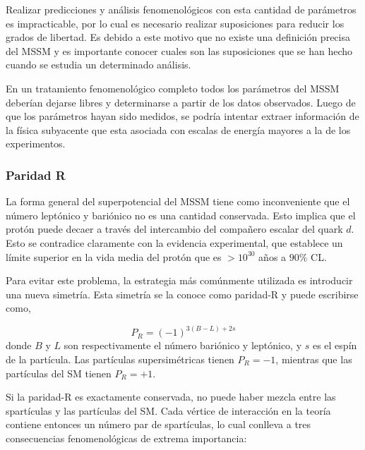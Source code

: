 Realizar predicciones y análisis fenomenológicos con esta cantidad de parámetros
es impracticable, por lo cual es necesario realizar suposiciones para reducir
los grados de libertad. Es debido a este motivo que no existe una definición
precisa del MSSM y es importante conocer cuales son las suposiciones que se han
hecho cuando se estudia un determinado análisis.

En un tratamiento fenomenológico completo todos los parámetros del MSSM deberían
dejarse libres y determinarse a partir de los datos observados. Luego de que los
parámetros hayan sido medidos, se podría intentar extraer información de la física
subyacente que esta asociada con escalas de energía mayores a la de los
experimentos.



\subsubsection{Paridad R}

La forma general del superpotencial del MSSM tiene como inconveniente que el
número leptónico y bariónico no es una cantidad conservada. Esto implica que el
protón puede decaer a través del intercambio del compañero escalar del quark
$d$. Esto se contradice claramente con la evidencia experimental, que establece
un límite superior en la vida media del protón que es $> 10^{30}$ a\~nos a $90\%$ CL\cite{PDG}.

Para evitar este problema, la estrategia más comúnmente utilizada es introducir
una nueva simetría. Esta simetría se la conoce como paridad-R y puede escribirse
como,

\begin{equation}
  P_R = (-1)^{3(B-L)+ 2s}
\end{equation}
%
donde $B$ y $L$ son respectivamente el número bariónico y leptónico, y $s$ es el
espín de la partícula. Las partículas supersimétricas tienen $P_R = -1$, mientras
que las partículas del SM tienen $P_R = +1$.

Si la paridad-R es exactamente conservada, no puede haber mezcla entre las
spartículas y las partículas del SM. Cada vértice de interacción en la teoría
contiene entonces un número par de spartículas, lo cual conlleva a tres
consecuencias fenomenológicas de extrema importancia:

